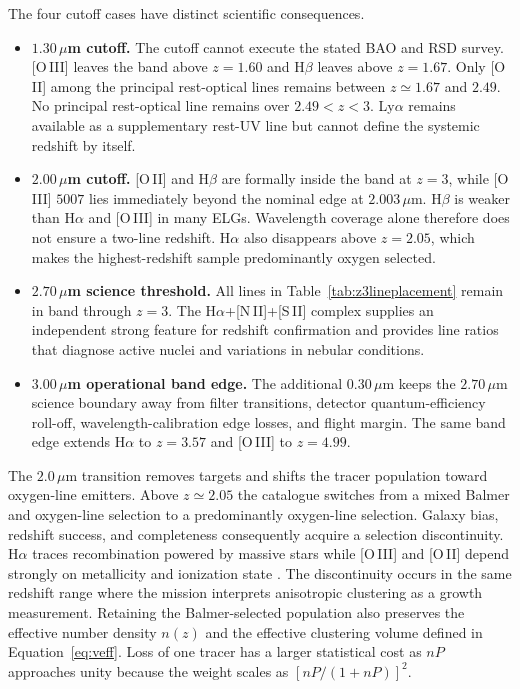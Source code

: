 \newpage
The four cutoff cases have distinct scientific consequences.
\begin{itemize}[leftmargin=1.7em,itemsep=0.45em,topsep=0.4em]
\item \textbf{$1.30\,\mu$m cutoff.} The cutoff cannot execute the stated BAO and RSD survey. [O\,III] leaves the band above $z=1.60$ and H$\beta$ leaves above $z=1.67$. Only [O\,II] among the principal rest-optical lines remains between $z\simeq1.67$ and $2.49$. No principal rest-optical line remains over $2.49<z<3$. Ly$\alpha$ remains available as a supplementary rest-UV line but cannot define the systemic redshift by itself.
\item \textbf{$2.00\,\mu$m cutoff.} [O\,II] and H$\beta$ are formally inside the band at $z=3$, while [O\,III] $5007$ lies immediately beyond the nominal edge at $2.003\,\mu$m. H$\beta$ is weaker than H$\alpha$ and [O\,III] in many ELGs. Wavelength coverage alone therefore does not ensure a two-line redshift. H$\alpha$ also disappears above $z=2.05$, which makes the highest-redshift sample predominantly oxygen selected.
\item \textbf{$2.70\,\mu$m science threshold.} All lines in Table~\ref{tab:z3lineplacement} remain in band through $z=3$. The H$\alpha$+[N\,II]+[S\,II] complex supplies an independent strong feature for redshift confirmation and provides line ratios that diagnose active nuclei and variations in nebular conditions.
\item \textbf{$3.00\,\mu$m operational band edge.} The additional $0.30\,\mu$m keeps the $2.70\,\mu$m science boundary away from filter transitions, detector quantum-efficiency roll-off, wavelength-calibration edge losses, and flight margin. The same band edge extends H$\alpha$ to $z=3.57$ and [O\,III] to $z=4.99$.
\end{itemize}

The $2.0\,\mu$m transition removes targets and shifts the tracer population toward oxygen-line emitters. Above $z\simeq2.05$ the catalogue switches from a mixed Balmer and oxygen-line selection to a predominantly oxygen-line selection. Galaxy bias, redshift success, and completeness consequently acquire a selection discontinuity. H$\alpha$ traces recombination powered by massive stars while [O\,III] and [O\,II] depend strongly on metallicity and ionization state \cite{kennicutt1998,khostovan2015,saito2020}. The discontinuity occurs in the same redshift range where the mission interprets anisotropic clustering as a growth measurement. Retaining the Balmer-selected population also preserves the effective number density $n(z)$ and the effective clustering volume defined in Equation~\eqref{eq:veff}. Loss of one tracer has a larger statistical cost as $nP$ approaches unity because the weight scales as $[nP/(1+nP)]^2$.

